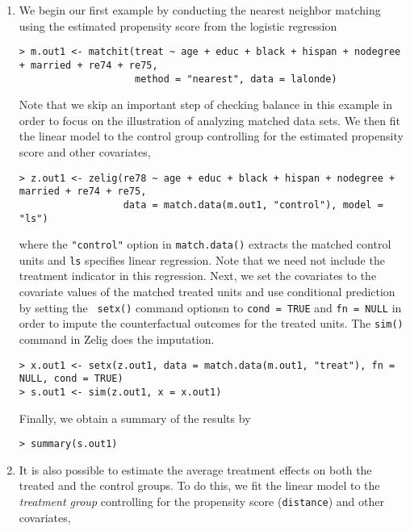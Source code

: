 \begin{enumerate}
\item We begin our first example by conducting the nearest neighbor
  matching using the estimated propensity score from the logistic
  regression
\begin{verbatim}
> m.out1 <- matchit(treat ~ age + educ + black + hispan + nodegree + married + re74 + re75, 
                    method = "nearest", data = lalonde)
\end{verbatim}
  Note that we skip an important step of checking balance in this
  example in order to focus on the illustration of analyzing matched
  data sets. We then fit the linear model to the control group
  controlling for the estimated propensity score and other covariates,
\begin{verbatim}
> z.out1 <- zelig(re78 ~ age + educ + black + hispan + nodegree + married + re74 + re75, 
                  data = match.data(m.out1, "control"), model = "ls")
\end{verbatim}
  where the {\tt "control"} option in {\tt match.data()} extracts the
  matched control units and {\tt ls} specifies linear regression. Note
  that we need not include the treatment indicator in this regression.
  Next, we set the covariates to the covariate values of the matched
  treated units and use conditional prediction by setting the {\tt
    setx()} command optionsn to {\tt cond = TRUE} and {\tt fn = NULL}
  in order to impute the counterfactual outcomes for the treated
  units. The {\tt sim()} command in Zelig does the imputation.
\begin{verbatim}
> x.out1 <- setx(z.out1, data = match.data(m.out1, "treat"), fn = NULL, cond = TRUE)
> s.out1 <- sim(z.out1, x = x.out1)
\end{verbatim}
Finally, we obtain a summary of the results by 
\begin{verbatim}
> summary(s.out1)
\end{verbatim}

\item It is also possible to estimate the average treatment effects on
  both the treated and the control groups. To do this, we fit the
  linear model to the {\it treatment group} controlling for the
  propensity score ({\tt distance}) and other covariates,


\end{enumerate}
